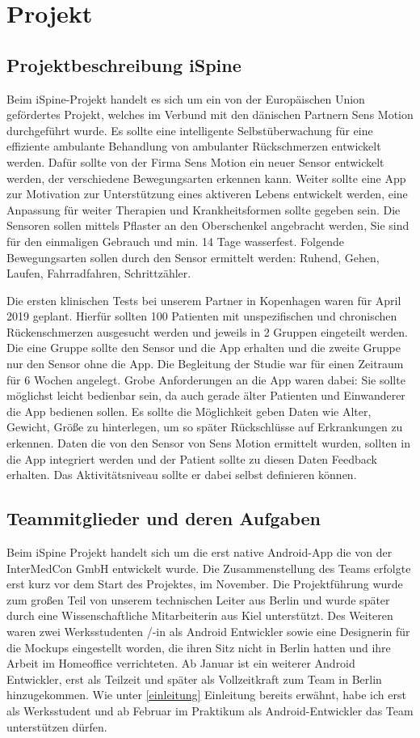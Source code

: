 \chapter{Projekt}
\section{Projektbeschreibung iSpine}\label{beschreibung}
Beim iSpine-Projekt handelt es sich um ein von der Europäischen Union gefördertes Projekt, welches im Verbund mit den dänischen Partnern Sens Motion durchgeführt wurde. Es sollte eine intelligente Selbstüberwachung für eine effiziente ambulante Behandlung von ambulanter Rückschmerzen entwickelt werden. Dafür sollte von der Firma Sens Motion ein neuer Sensor entwickelt werden, der verschiedene Bewegungsarten erkennen kann. Weiter sollte eine App zur Motivation zur Unterstützung eines aktiveren Lebens entwickelt werden, eine Anpassung für weiter Therapien und Krankheitsformen sollte gegeben sein. Die Sensoren sollen mittels Pflaster an den Oberschenkel angebracht werden, Sie sind für den einmaligen Gebrauch und min. 14 Tage wasserfest. Folgende  Bewegungsarten sollen durch den Sensor ermittelt werden: Ruhend, Gehen, Laufen, Fahrradfahren, Schrittzähler. 


Die ersten klinischen Tests bei unserem Partner in Kopenhagen waren für April 2019 geplant. Hierfür sollten 100 Patienten mit unspezifischen und chronischen Rückenschmerzen ausgesucht werden und jeweils in 2 Gruppen eingeteilt werden. Die eine Gruppe sollte den Sensor und die App erhalten und die zweite Gruppe nur den Sensor ohne die App.  Die Begleitung der Studie war für einen Zeitraum für 6 Wochen angelegt. Grobe Anforderungen an die App waren dabei:
Sie sollte möglichst leicht bedienbar sein, da auch gerade älter Patienten und Einwanderer die App bedienen sollen. Es sollte die Möglichkeit geben Daten wie Alter, Gewicht, Größe zu hinterlegen, um so später Rückschlüsse auf Erkrankungen zu erkennen. Daten die von den Sensor von Sens Motion ermittelt wurden, sollten in die App integriert werden und der Patient sollte zu diesen Daten Feedback erhalten. Das Aktivitätsniveau sollte er dabei selbst definieren können.


\section{Teammitglieder und deren Aufgaben}\label{team}
Beim iSpine Projekt handelt sich um die erst native Android-App die von der InterMedCon GmbH entwickelt wurde. Die Zusammenstellung des Teams erfolgte erst kurz vor dem Start des Projektes, im November. Die Projektführung wurde zum großen Teil von unserem technischen Leiter aus Berlin und wurde später durch eine Wissenschaftliche Mitarbeiterin aus Kiel unterstützt. Des Weiteren waren zwei Werksstudenten /-in als Android Entwickler sowie eine Designerin für die Mockups eingestellt worden, die ihren Sitz nicht in Berlin hatten und ihre Arbeit im Homeoffice verrichteten. Ab Januar ist ein weiterer Android Entwickler, erst als Teilzeit und später als Vollzeitkraft zum Team in Berlin hinzugekommen. Wie unter \ref*{einleitung} Einleitung bereits erwähnt, habe ich erst als Werksstudent und ab Februar im Praktikum als Android-Entwickler das Team unterstützen dürfen. 

